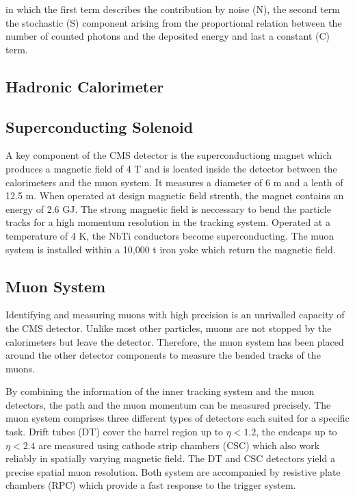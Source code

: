 in which the first term describes the contribution by noise (N), the second
term the stochastic (S) component arising from the proportional relation between
the number of counted photons and the deposited energy and last a constant (C)
term.

\subsection{Hadronic Calorimeter}
\subsection{Superconducting Solenoid}

A key component of the CMS detector is the superconductiong magnet which
produces a magnetic field of 4 T and is located inside the detector between the
calorimeters and the muon system. It measures a diameter of 6 m and a lenth of
12.5 m. When operated at design magnetic field strenth, the magnet contains an
energy of 2.6 GJ. The strong magnetic field is neccessary to bend the particle
tracks for a high momentum resolution in the tracking system. Operated at a
temperature of 4 K, the NbTi conductors become superconducting. The muon system
is installed within a 10,000 t iron yoke which return the magnetic field.

\subsection{Muon System}

Identifying and measuring muons with high precision is an unrivalled capacity of
the CMS detector. Unlike most other particles, muons are not stopped by the
calorimeters but leave the detector. Therefore, the muon system has been placed
around the other detector components to measure the bended tracks of the muons.

By combining the information of the inner tracking system and the muon
detectors, the path and the muon momentum can be measured
precisely. The muon system comprises three different types of detectors each
suited for a specific task. Drift tubes (DT) cover the barrel region up to
$\eta < 1.2$, the endcaps up to $\eta < 2.4$ are measured using cathode strip
chambers (CSC) which also work reliably in spatially varying magnetic field. The
DT and CSC detectors yield a precise spatial muon resolution. Both system are
accompanied by resistive plate chambers (RPC) which provide a fast response to
the trigger system.

